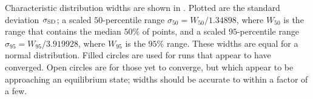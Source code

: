 Characteristic distribution widths are shown in . Plotted are the standard deviation $\sigma_\mathrm{SD}$; a scaled $50$-percentile range $\sigma_{50} = W_{50}/1.34898$, where $W_{50}$ is the range that contains the median $50\%$ of points, and a scaled $95$-percentile range $\sigma_{95} = W_{95}/3.919928$, where $W_{95}$ is the $95\%$ range. These widths are equal for a normal distribution. Filled circles are used for runs that appear to have converged. Open circles are for those yet to converge, but which appear to be approaching an equilibrium state; widths should be accurate to within a factor of a few.
\begin{figure}[!htp]
\begin{center}
 \quad
{} \\
 \quad

\end{center}
\end{figure}

